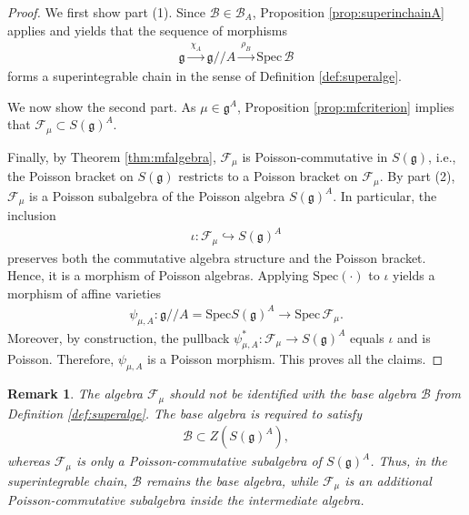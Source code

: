 \documentclass[11pt,reqno]{amsart}
\newtheorem*{theorem A}{Main Theorem A}
\newtheorem*{theorem B}{Main Theorem B}
\newtheorem*{theorem C}{Main Theorem C}
\newtheorem*{theorem D}{Main Theorem D}
\theoremstyle{definition}
\theoremstyle{plain}
\newtheorem{remark}[theorem]{Remark}
\theoremstyle{conclusion}
\begin{document}
\begin{proof}
We first show part (1). Since $ \mathcal{B}\in\mathcal{B}_A$, Proposition \ref{prop:superinchainA} applies and yields that the sequence of morphisms
\begin{align*}
\mathfrak{g} \xrightarrow{\ \chi_A\ } \mathfrak{g}//A \xrightarrow{\ \rho_B\ } \mathrm{Spec} \, \mathcal{B}
\end{align*}
forms a superintegrable chain in the sense of Definition \ref{def:superalge}. 

We now show the second part. As $\mu\in\mathfrak{g}^A$, Proposition \ref{prop:mfcriterion} implies that $\mathcal{F}_\mu\subset S(\mathfrak{g})^A$.  

Finally, by Theorem \ref{thm:mfalgebra}, $\mathcal{F}_\mu$ is Poisson-commutative in $S(\mathfrak{g})$, i.e., the Poisson bracket on $S(\mathfrak{g})$ restricts to a Poisson bracket on $\mathcal{F}_\mu$.
By part (2),  $\mathcal{F}_\mu$ is a Poisson subalgebra of the Poisson algebra $S(\mathfrak{g})^A$. In particular, the inclusion \begin{align*}
\iota:\mathcal{F}_\mu \hookrightarrow S(\mathfrak{g})^A
\end{align*} preserves both the commutative algebra structure and the Poisson bracket. Hence, it is a morphism of Poisson algebras. Applying $\mathrm{Spec}(\cdot)$ to $\iota$ yields a morphism of affine varieties
\begin{align*}
\psi_{\mu,A}:\mathfrak{g}//A=\mathrm{Spec} S(\mathfrak{g})^A \longrightarrow \mathrm{Spec} \,\mathcal{F}_\mu.
\end{align*}
Moreover, by construction, the pullback $\psi_{\mu,A}^*:\mathcal{F}_\mu\to S(\mathfrak{g})^A$ equals $\iota$ and is Poisson. Therefore, $\psi_{\mu,A}$ is a Poisson morphism. This proves all the claims.
\end{proof}

\begin{remark}
\label{rem:mf-not-base}
The algebra $\mathcal{F}_\mu$ should not be identified with the base algebra $ \mathcal{B}$ from Definition \ref{def:superalge}. The base algebra is required to satisfy
\begin{align*}
\mathcal{B} \subset Z(S(\mathfrak{g})^A),
\end{align*}
whereas $\mathcal{F}_\mu$ is only a Poisson-commutative subalgebra of $S(\mathfrak{g})^A$. Thus, in the superintegrable chain, $ \mathcal{B}$ remains the base algebra, while $\mathcal{F}_\mu$ is an additional Poisson-commutative subalgebra inside the intermediate algebra.
\end{remark}
\end{document}
